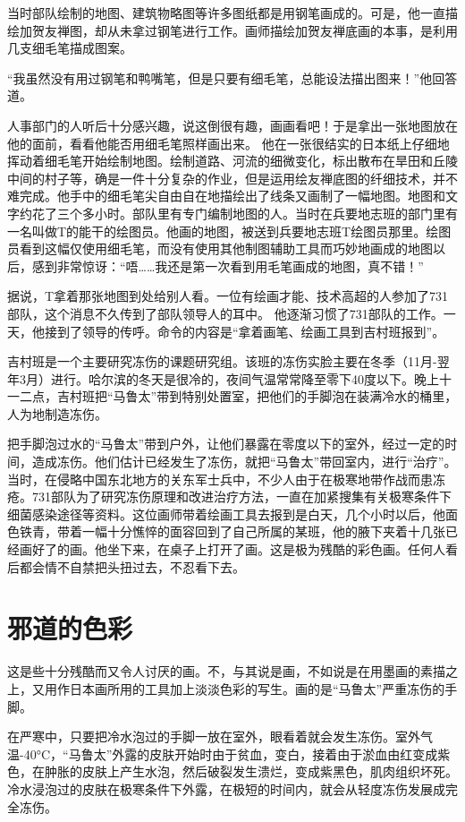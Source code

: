 \documentclass[a4paper,12pt,UTF8,twoside]{ctexbook}
\begin{document}
当时部队绘制的地图、建筑物略图等许多图纸都是用钢笔画成的。可是，他一直描绘加贺友禅图，却从未拿过钢笔进行工作。画师描绘加贺友禅底画的本事，是利用几支细毛笔描成图案。

“我虽然没有用过钢笔和鸭嘴笔，但是只要有细毛笔，总能设法描出图来！”他回答道。

人事部门的人听后十分感兴趣，说这倒很有趣，画画看吧！于是拿出一张地图放在他的面前，看看他能否用细毛笔照样画出来。
他在一张很结实的日本纸上仔细地挥动着细毛笔开始绘制地图。绘制道路、河流的细微变化，标出散布在旱田和丘陵中间的村子等，确是一件十分复杂的作业，但是运用绘友禅底图的纤细技术，并不难完成。他手中的细毛笔尖自由自在地描绘出了线条又画制了一幅地图。地图和文字约花了三个多小时。部队里有专门编制地图的人。当时在兵要地志班的部门里有一名叫做T的能干的绘图员。他画的地图，被送到兵要地志班T绘图员那里。绘图员看到这幅仅使用细毛笔，而没有使用其他制图辅助工具而巧妙地画成的地图以后，感到非常惊讶：“唔……我还是第一次看到用毛笔画成的地图，真不错！”

据说，T拿着那张地图到处给别人看。一位有绘画才能、技术高超的人参加了731部队，这个消息不久传到了部队领导人的耳中。
他逐渐习惯了731部队的工作。一天，他接到了领导的传呼。命令的内容是“拿着画笔、绘画工具到吉村班报到”。

吉村班是一个主要研究冻伤的课题研究组。该班的冻伤实脸主要在冬季（11月-翌年3月）进行。哈尔滨的冬天是很冷的，夜间气温常常降至零下40度以下。晚上十一二点，吉村班把“马鲁太”带到特别处置室，把他们的手脚泡在装满冷水的桶里，人为地制造冻伤。

把手脚泡过水的“马鲁太”带到户外，让他们暴露在零度以下的室外，经过一定的时间，造成冻伤。他们估计已经发生了冻伤，就把“马鲁太”带回室内，进行“治疗”。当时，在侵略中国东北地方的关东军士兵中，不少人由于在极寒地带作战而患冻疮。731部队为了研究冻伤原理和改进治疗方法，一直在加紧搜集有关极寒条件下细菌感染途径等资料。这位画师带着绘画工具去报到是白天，几个小时以后，他面色铁青，带着一幅十分憔悴的面容回到了自己所属的某班，他的腋下夹着十几张已经画好了的画。他坐下来，在桌子上打开了画。这是极为残酷的彩色画。任何人看后都会情不自禁把头扭过去，不忍看下去。

\section{邪道的色彩}

这是些十分残酷而又令人讨厌的画。不，与其说是画，不如说是在用墨画的素描之上，又用作日本画所用的工具加上淡淡色彩的写生。画的是“马鲁太”严重冻伤的手脚。

在严寒中，只要把冷水泡过的手脚一放在室外，眼看着就会发生冻伤。室外气温-40°C，“马鲁太”外露的皮肤开始时由于贫血，变白，接着由于淤血由红变成紫色，在肿胀的皮肤上产生水泡，然后破裂发生溃烂，变成紫黑色，肌肉组织坏死。冷水浸泡过的皮肤在极寒条件下外露，在极短的时间内，就会从轻度冻伤发展成完全冻伤。
\end{document}
